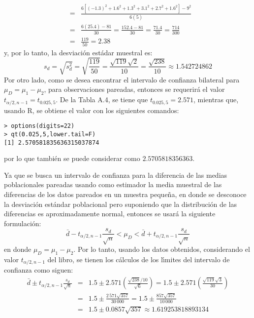 \begin{solucion}
\begin{eqnarray*}
  & = & \frac{6\left[ (-1.3)^2 + 1.6^2 + 1.3^2 + 3.1^2 + 2.7^2 + 1.6^2 \right] - 9^2}{6(5)} \\
  & = & \frac{6(25.4) - 81}{30} = \frac{152.4 - 81}{30} = \frac{71.4}{30} = \frac{714}{300} \\
  & = & \frac{119}{50} = 2.38
 \end{eqnarray*}
 y, por lo tanto, la desviaci\'on est\'adar muestral es:
 \begin{equation*}
  s_d = \sqrt{s_d^2} = \sqrt{\frac{119}{50}} = \frac{\sqrt{119}\sqrt{2}}{10} = \frac{\sqrt{238}}{10} \approx 1.542724862
 \end{equation*}
 Por otro lado, como se desea encontrar el intervalo de confianza bilateral para $\mu_D = \mu_1 - \mu_2$, para observaciones pareadas, entonces se requerir\'a el valor $t_{\alpha/2,n-1} = t_{0.025,5}$. De la Tabla A.4, se tiene que $t_{0.025,5} = 2.571$, mientras que, usando R, se obtiene el valor con los siguientes comandos:
 \begin{verbatim}
> options(digits=22)
> qt(0.025,5,lower.tail=F)
[1] 2.570581835636315037874
 \end{verbatim}
 \vspace{-0.5cm}
 por lo que tambi\'en se puede considerar como $2.5705818356363$.
 \par 
 Ya que se busca un intervalo de confianza para la diferencia de las medias poblacionales pareadas usando como estimador la media muestral de las diferencias de los datos pareados en un muestra peque\~na, en donde se desconoce la desviaci\'on est\'andar poblacional pero suponiendo que la distribuci\'on de las diferencias es aproximadamente normal, entonces se usar\'a la siguiente formulaci\'on:
 \begin{equation*}
  \bar{d} - t_{\alpha/2,n-1}\frac{s_d}{\sqrt{n}} < \mu_D < \bar{d} + t_{\alpha/2,n-1}\frac{s_d}{\sqrt{n}}
 \end{equation*}
 en donde $\mu_D = \mu_1 - \mu_2$. Por lo tanto, usando los datos obtenidos, considerando el valor $t_{\alpha/2,n-1}$ del libro, se tienen los c\'alculos de los l\'{\i}mites del intervalo de confianza como siguen:
 \begin{eqnarray*}
  \bar{d} \pm t_{\alpha/2,n-1}\frac{s_d}{\sqrt{n}} & = & 1.5 \pm 2.571 \left( \frac{\sqrt{238}/10}{\sqrt{6}} \right) = 1.5 \pm 2.571 \left( \frac{\sqrt{119}\sqrt{3}}{30} \right) \\
  & = & 1.5 \pm \frac{2\,571\sqrt{357}}{30\,000} = 1.5\pm \frac{857\sqrt{357}}{10\,000} \\
  & = & 1.5 \pm 0.0857\sqrt{357} \approx 1.619253818893134

\end{eqnarray*}
\end{solucion}
